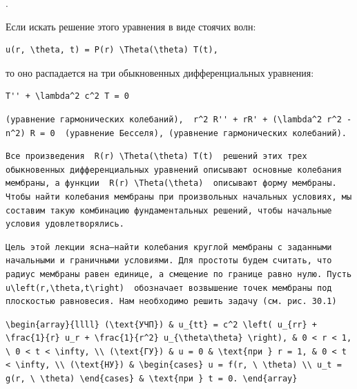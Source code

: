 \documentclass[
  ukrainian,
]{article}
\begin{document}
.

Если искать решение этого уравнения в виде стоячих волн:

\begin{verbatim}
u(r, \theta, t) = P(r) \Theta(\theta) T(t),
\end{verbatim}

то оно распадается на три обыкновенных дифференциальных уравнения:

\begin{verbatim}
T'' + \lambda^2 c^2 T = 0
\end{verbatim}

\begin{verbatim}
(уравнение гармонических колебаний),  r^2 R'' + rR' + (\lambda^2 r^2 - n^2) R = 0  (уравнение Бесселя), (уравнение гармонических колебаний).
\end{verbatim}

\begin{verbatim}
Все произведения  R(r) \Theta(\theta) T(t)  решений этих трех обыкновенных дифференциальных уравнений описывают основные колебания мембраны, а функции  R(r) \Theta(\theta)  описывают форму мембраны. Чтобы найти колебания мембраны при произвольных начальных условиях, мы составим такую комбинацию фундаментальных решений, чтобы начальные условия удовлетворялись.
\end{verbatim}

\begin{verbatim}
Цель этой лекции ясна—найти колебания круглой мембраны с заданными начальными и граничными условиями. Для простоты будем считать, что радиус мембраны равен единице, а смещение по границе равно нулю. Пусть  u\left(r,\theta,t\right)  обозначает возвышение точек мембраны под плоскостью равновесия. Нам необходимо решить задачу (см. рис. 30.1)
\end{verbatim}

\begin{verbatim}
\begin{array}{llll} (\text{УЧП}) & u_{tt} = c^2 \left( u_{rr} + \frac{1}{r} u_r + \frac{1}{r^2} u_{\theta\theta} \right), & 0 < r < 1, \ 0 < t < \infty, \\ (\text{ГУ}) & u = 0 & \text{при } r = 1, & 0 < t < \infty, \\ (\text{НУ}) & \begin{cases} u = f(r, \ \theta) \\ u_t = g(r, \ \theta) \end{cases} & \text{при } t = 0. \end{array}
\end{verbatim}
\end{document}
